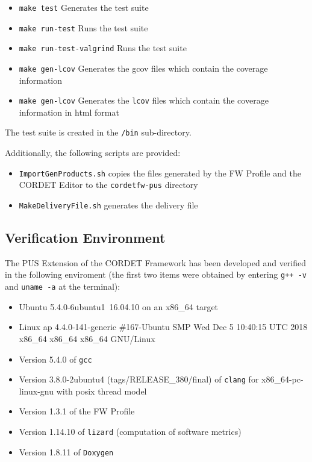\documentclass{pnp_article}
\begin{document}
\begin{itemize}
\item \texttt{make test} Generates the test suite
\item \texttt{make run-test} Runs the test suite
\item \texttt{make run-test-valgrind} Runs the test suite
\item \texttt{make gen-lcov} Generates the gcov files which contain the coverage information
\item \texttt{make gen-lcov} Generates the \texttt{lcov} files which contain the coverage information in html format
\end{itemize}

The test suite is created in the \texttt{/bin} sub-directory.

Additionally, the following scripts are provided:

\begin{itemize}
\item \texttt{ImportGenProducts.sh} copies the files generated by the FW Profile and the CORDET Editor to the \texttt{cordetfw-pus} directory
\item \texttt{MakeDeliveryFile.sh} generates the delivery file
\end{itemize}

\subsection{Verification Environment}\label{sec:umVerEnviron}
The PUS Extension of the CORDET Framework has been developed and verified in the following enviroment (the first two items were obtained by entering \texttt{g++ -v} and \texttt{uname -a} at the terminal):

\begin{itemize}
\item Ubuntu 5.4.0-6ubuntu1~16.04.10 on an x86\_64 target
\item Linux ap 4.4.0-141-generic \#167-Ubuntu SMP Wed Dec 5 10:40:15 UTC 2018 x86\_64 x86\_64 x86\_64 GNU/Linux
\item Version 5.4.0 of \texttt{gcc}
\item Version 3.8.0-2ubuntu4 (tags/RELEASE\_380/final) of \texttt{clang} for x86\_64-pc-linux-gnu with posix thread model
\item Version 1.3.1 of the FW Profile
\item Version 1.14.10 of \texttt{lizard} (computation of software metrics)
\item Version 1.8.11 of \texttt{Doxygen}
\end{itemize}
\end{document}
